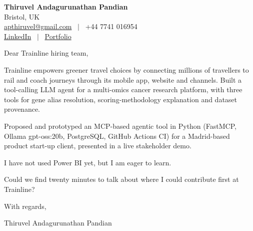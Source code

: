 \documentclass[11pt,a4paper]{article}
\begin{document}
\raggedright
\pagestyle{empty}

\begin{center}
    {\LARGE \color{linkblue} \textbf{Thiruvel Andagurunathan Pandian}}\\[0.2cm]
    Bristol, UK \\
    \href{mailto:apthiruvel@gmail.com}{apthiruvel@gmail.com} \ $|$ \ +44 7741 016954 \\
\href{https://www.linkedin.com/in/thiruvel-a-p/}{LinkedIn} \ $|$ \ \href{https://thiruvel-ap.github.io/PersonalPortfolio/}{Portfolio}
\end{center}

\vspace{0.4cm}

\noindent
Dear Trainline hiring team,

Trainline empowers greener travel choices by connecting millions of travellers to rail and coach journeys through its mobile app, website and channels. Built a tool-calling LLM agent for a multi-omics cancer research platform, with three tools for gene alias resolution, scoring-methodology explanation and dataset provenance.

Proposed and prototyped an MCP-based agentic tool in Python (FastMCP, Ollama gpt-oss:20b, PostgreSQL, GitHub Actions CI) for a Madrid-based product start-up client, presented in a live stakeholder demo.

I have not used Power BI yet, but I am eager to learn.

Could we find twenty minutes to talk about where I could contribute first at Trainline?

\vspace{0.5cm}

With regards,

Thiruvel Andagurunathan Pandian
\end{document}
